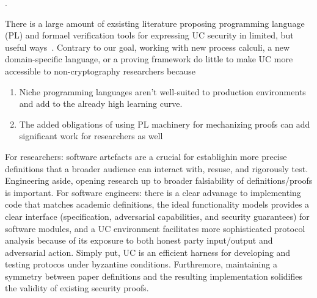 .

There is a large amount of exsisting literature proposing programming language (PL) and formael verification tools for expressing UC security in limited, but useful ways~\cite{.}.
Contrary to our goal, working with new process calculi, a new domain-specific language, or a proving framework do little to make UC more accessible to non-cryptography researchers because 
\begin{enumerate}
\item Niche programming languages aren't well-suited to production environments and add to the already high learning curve.
\item The added obligations of using PL machinery for mechanizing proofs can add significant work for researchers as well~\cite{ironfleet,easycryptuc}  
\end{enumerate}

For researchers: software artefacts are a crucial for establighin more precise definitions that a broader audience can interact with, resuse, and rigorously test. 
Engineering aside, opening research up to broader falsiability of definitions/proofs is important.
For software engineers: there is a clear advanage to implementing code that matches academic definitions, the ideal functionality models provides a clear interface (specification, adversarial capabilities, and security guarantees) for software modules, and a UC environment facilitates more sophisticated protocol analysis because of its exposure to both honest party input/output and adversarial action.
Simply put, UC is an efficient  harness for developing and testing protocos under byzantine conditions.
Furthremore, maintaining a symmetry between paper definitions and the resulting implementation solidifies the validity of existing security proofs.


